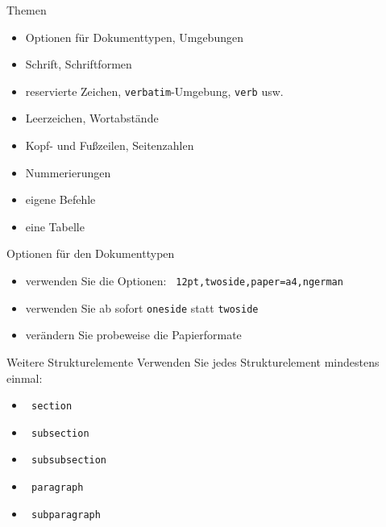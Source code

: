 \begin{frame}{Themen}
\begin{itemize}
    \item Optionen für Dokumenttypen, Umgebungen
    \item Schrift, Schriftformen
    \item reservierte Zeichen, \lstinline|verbatim|-Umgebung, \lstinline|verb| usw.
    \item Leerzeichen, Wortabstände
    \item Kopf- und Fußzeilen, Seitenzahlen
    \item Nummerierungen
    \item eigene Befehle
    \item eine Tabelle

\end{itemize}
\end{frame}

\begin{frame}{Optionen für den Dokumenttypen}
    \begin{itemize}
        \item verwenden Sie die Optionen: \lstinline| 12pt,twoside,paper=a4,ngerman |
        \item verwenden Sie ab sofort \lstinline|oneside| statt \lstinline|twoside|
        \item verändern Sie probeweise die Papierformate
    \end{itemize}
\end{frame}

\begin{frame}{Weitere Strukturelemente}
Verwenden Sie jedes Strukturelement mindestens einmal:
    \begin{itemize}
        \item \lstinline| section|
        \item \lstinline| subsection|
        \item \lstinline| subsubsection|
        \item \lstinline| paragraph|
        \item \lstinline| subparagraph|
    \end{itemize}
\end{frame}
